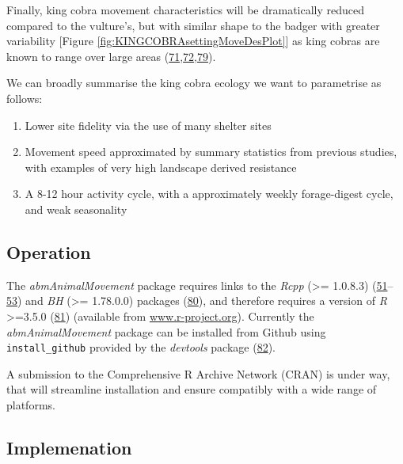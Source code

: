 \documentclass[10pt,a4paper]{article}
\begin{document}
Finally, king cobra movement characteristics will be dramatically reduced compared to the vulture's, but with similar shape to the badger with greater variability {[}Figure \ref{fig:KINGCOBRAsettingMoveDesPlot}{]} as king cobras are known to range over large areas (\protect\hyperlink{ref-Marshall2018}{71},\protect\hyperlink{ref-marshall_no_2020}{72},\protect\hyperlink{ref-Silva2018}{79}).

We can broadly summarise the king cobra ecology we want to parametrise as follows:

\begin{enumerate}
\def\labelenumi{\arabic{enumi}.}
\item
  Lower site fidelity via the use of many shelter sites
\item
  Movement speed approximated by summary statistics from previous studies, with examples of very high landscape derived resistance
\item
  A 8-12 hour activity cycle, with a approximately weekly forage-digest cycle, and weak seasonality
\end{enumerate}

\hypertarget{operation}{%
\subsection{Operation}\label{operation}}

The \emph{abmAnimalMovement} package requires links to the \emph{Rcpp} (\textgreater= 1.0.8.3) (\protect\hyperlink{ref-Eddelbuettel_seamless_2011}{51}--\protect\hyperlink{ref-Eddelbuettel_extending_2018}{53}) and \emph{BH} (\textgreater= 1.78.0.0) packages (\protect\hyperlink{ref-Eddelbuettel_BH_2021}{80}), and therefore requires a version of \emph{R} \textgreater=3.5.0 (\protect\hyperlink{ref-R-base}{81}) (available from \href{https://www.r-project.org/}{www.r-project.org}).
Currently the \emph{abmAnimalMovement} package can be installed from Github using \texttt{install\_github} provided by the \emph{devtools} package (\protect\hyperlink{ref-Wickham_devtools_2021}{82}).

A submission to the Comprehensive R Archive Network (CRAN) is under way, that will streamline installation and ensure compatibly with a wide range of platforms.

\hypertarget{implemenation}{%
\subsection{Implemenation}\label{implemenation}}
\end{document}
